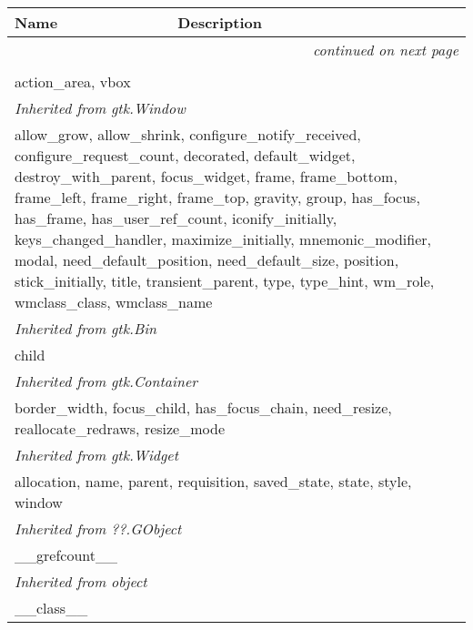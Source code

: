     \vspace{-1cm}
\hspace{\varindent}\begin{longtable}{|p{\varnamewidth}|p{\vardescrwidth}|l}
\cline{1-2}
\cline{1-2} \centering \textbf{Name} & \centering \textbf{Description}& \\
\cline{1-2}
\endhead\cline{1-2}\multicolumn{3}{r}{\small\textit{continued on next page}}\\\endfoot\cline{1-2}
\endlastfoot\multicolumn{2}{|l|}{\textit{Inherited from gtk.Dialog}}\\
\multicolumn{2}{|p{\varwidth}|}{\raggedright action\_area, vbox}\\
\cline{1-2}
\multicolumn{2}{|l|}{\textit{Inherited from gtk.Window}}\\
\multicolumn{2}{|p{\varwidth}|}{\raggedright allow\_grow, allow\_shrink, configure\_notify\_received, configure\_request\_count, decorated, default\_widget, destroy\_with\_parent, focus\_widget, frame, frame\_bottom, frame\_left, frame\_right, frame\_top, gravity, group, has\_focus, has\_frame, has\_user\_ref\_count, iconify\_initially, keys\_changed\_handler, maximize\_initially, mnemonic\_modifier, modal, need\_default\_position, need\_default\_size, position, stick\_initially, title, transient\_parent, type, type\_hint, wm\_role, wmclass\_class, wmclass\_name}\\
\cline{1-2}
\multicolumn{2}{|l|}{\textit{Inherited from gtk.Bin}}\\
\multicolumn{2}{|p{\varwidth}|}{\raggedright child}\\
\cline{1-2}
\multicolumn{2}{|l|}{\textit{Inherited from gtk.Container}}\\
\multicolumn{2}{|p{\varwidth}|}{\raggedright border\_width, focus\_child, has\_focus\_chain, need\_resize, reallocate\_redraws, resize\_mode}\\
\cline{1-2}
\multicolumn{2}{|l|}{\textit{Inherited from gtk.Widget}}\\
\multicolumn{2}{|p{\varwidth}|}{\raggedright allocation, name, parent, requisition, saved\_state, state, style, window}\\
\cline{1-2}
\multicolumn{2}{|l|}{\textit{Inherited from ??.GObject}}\\
\multicolumn{2}{|p{\varwidth}|}{\raggedright \_\_grefcount\_\_}\\
\cline{1-2}
\multicolumn{2}{|l|}{\textit{Inherited from object}}\\
\multicolumn{2}{|p{\varwidth}|}{\raggedright \_\_class\_\_}\\
\cline{1-2}
\end{longtable}


